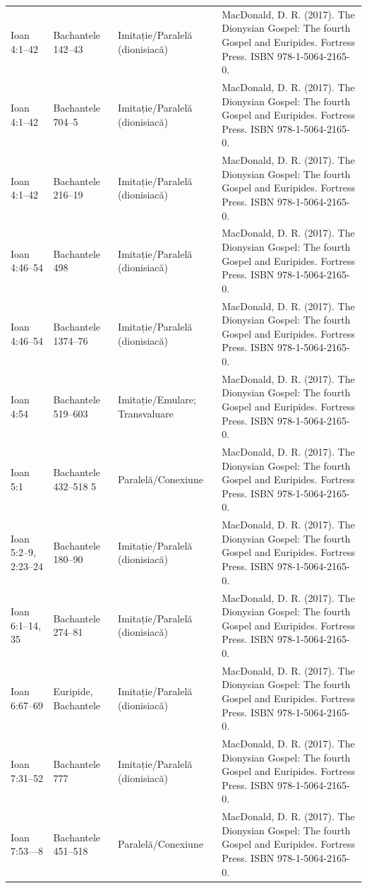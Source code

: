 \documentclass[12pt,a4paper,twoside,openany]{book}
\begin{document}
\begin{longtable}{L{1.4cm}L{1.7cm}L{3.1cm}L{8.4cm}}
Ioan 4:1–42 & Bachantele 142–43 & Imitație/Paralelă (dionisiacă) & MacDonald, D. R. (2017). The Dionysian Gospel: The fourth Gospel and Euripides. Fortress Press. ISBN 978-1-5064-2165-0. \\
Ioan 4:1–42 & Bachantele 704–5 & Imitație/Paralelă (dionisiacă) & MacDonald, D. R. (2017). The Dionysian Gospel: The fourth Gospel and Euripides. Fortress Press. ISBN 978-1-5064-2165-0. \\
Ioan 4:1–42 & Bachantele 216–19 & Imitație/Paralelă (dionisiacă) & MacDonald, D. R. (2017). The Dionysian Gospel: The fourth Gospel and Euripides. Fortress Press. ISBN 978-1-5064-2165-0. \\
Ioan 4:46–54 & Bachantele 498 & Imitație/Paralelă (dionisiacă) & MacDonald, D. R. (2017). The Dionysian Gospel: The fourth Gospel and Euripides. Fortress Press. ISBN 978-1-5064-2165-0. \\
Ioan 4:46–54 & Bachantele 1374–76 & Imitație/Paralelă (dionisiacă) & MacDonald, D. R. (2017). The Dionysian Gospel: The fourth Gospel and Euripides. Fortress Press. ISBN 978-1-5064-2165-0. \\
Ioan 4:54 & Bachantele 519–603 & Imitație/Emulare; Transvaluare & MacDonald, D. R. (2017). The Dionysian Gospel: The fourth Gospel and Euripides. Fortress Press. ISBN 978-1-5064-2165-0. \\
Ioan 5:1 & Bachantele 432–518 5 & Paralelă/Conexiune & MacDonald, D. R. (2017). The Dionysian Gospel: The fourth Gospel and Euripides. Fortress Press. ISBN 978-1-5064-2165-0. \\
Ioan 5:2–9, 2:23–24 & Bachantele 180–90 & Imitație/Paralelă (dionisiacă) & MacDonald, D. R. (2017). The Dionysian Gospel: The fourth Gospel and Euripides. Fortress Press. ISBN 978-1-5064-2165-0. \\
Ioan 6:1–14, 35 & Bachantele 274–81 & Imitație/Paralelă (dionisiacă) & MacDonald, D. R. (2017). The Dionysian Gospel: The fourth Gospel and Euripides. Fortress Press. ISBN 978-1-5064-2165-0. \\
Ioan 6:67–69 & Euripide, Bachantele & Imitație/Paralelă (dionisiacă) & MacDonald, D. R. (2017). The Dionysian Gospel: The fourth Gospel and Euripides. Fortress Press. ISBN 978-1-5064-2165-0. \\
Ioan 7:31–52 & Bachantele 777 & Imitație/Paralelă (dionisiacă) & MacDonald, D. R. (2017). The Dionysian Gospel: The fourth Gospel and Euripides. Fortress Press. ISBN 978-1-5064-2165-0. \\
Ioan 7:53—8 & Bachantele 451–518 & Paralelă/Conexiune & MacDonald, D. R. (2017). The Dionysian Gospel: The fourth Gospel and Euripides. Fortress Press. ISBN 978-1-5064-2165-0. \\

\end{longtable}
\end{document}
